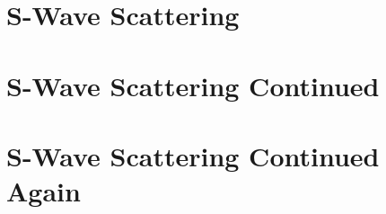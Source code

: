 \documentclass[
a4paper,
10pt,
twoside,
]{article}
\begin{document}
{}
\maketitle
\startmcols

\section{S-Wave Scattering}\label{sec: I}
\section{S-Wave Scattering Continued}\label{sec: II}
\section{S-Wave Scattering Continued Again}\label{sec: III}

\stopmcols
\end{document}
